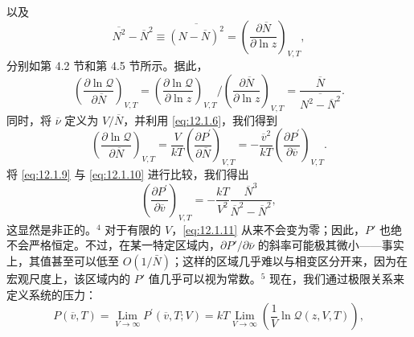 以及
\begin{equation}\tag{12.1.8}\label{eq:12.1.8}
\overline { { N ^{2} } } - \overline { { N } } ^{2} \equiv \overline { { ( N - \overline { { N } } ) ^{2} } } = \left( \frac { \partial \overline { { N } } } { \partial \ln z } \right) _ { V , T } ,
\end{equation}
分别如第 4.2 节和第 4.5 节所示。据此，
\begin{equation}\tag{12.1.9}\label{eq:12.1.9}
\left( \frac { \partial \ln \mathcal { Q } } { \partial \overline { { N } } } \right) _ { V , T } = \left( \frac { \partial \ln \mathcal { Q } } { \partial \ln z } \right) _ { V , T } \Bigg / \left( \frac { \partial \overline { { N } } } { \partial \ln z } \right) _ { V , T } = \frac { \overline { { N } } } { \overline { { N ^{2} - \overline { { N } } ^{2} } } } .
\end{equation}
同时，将 \(\overline{\nu}\) 定义为 \(V/\overline{N}\)，并利用 \autoref{eq:12.1.6}，我们得到
\begin{equation}\tag{12.1.10}\label{eq:12.1.10}
\left( \frac { \partial \ln \mathcal { Q } } { \partial \overline { { N } } } \right) _ { V , T } = \frac { V } { k T } \left( \frac { \partial P ^{\prime} } { \partial \overline { { N } } } \right) _ { V , T } = - \frac { \overline { { v } } ^{2} } { k T } \left( \frac { \partial P ^{\prime} } { \partial \overline { { v } } } \right) _ { V , T } .
\end{equation}
将 \autoref{eq:12.1.9} 与 \autoref{eq:12.1.10} 进行比较，我们得出
\begin{equation}\tag{12.1.11}\label{eq:12.1.11}
\left( \frac { \partial P ^{\prime} } { \partial \overline { { v } } } \right) _ { V , T } = - \frac { k T } { V ^{2} } \frac { \overline { { N } } ^{3} } { \overline { { N } } ^{2} - \overline { { N } } ^{2} } ,
\end{equation}
这显然是非正的。\(^{4}\) 对于有限的 \(V\)，\autoref{eq:12.1.11} 从来不会变为零；因此，\(P'\) 也绝不会严格恒定。不过，在某一特定区域内，\(\partial P'/\partial\bar{\nu}\) 的斜率可能极其微小——事实上，其值甚至可以低至 \(O(1/\bar{N})\)；这样的区域几乎难以与相变区分开来，因为在宏观尺度上，该区域内的 \(P'\) 值几乎可以视为常数。\(^{5}\)
现在，我们通过极限关系来定义系统的压力：
\begin{equation}\tag{12.1.12}\label{eq:12.1.12}
P ( \overline { { v } } , T ) = \operatorname* { L i m } _ { V \rightarrow \infty } P ^{\prime} \left( \overline { { v } } , T ; V \right) = k T \operatorname* { L i m } _ { V \rightarrow \infty } \left( \frac { 1 } { V } \ln \mathcal { Q } ( z , V , T ) \right) ,
\end{equation}
